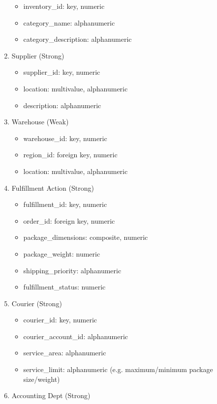 \documentclass{article}
\begin{document}
\begin{enumerate}
    \begin{itemize}
        \item inventory\_id: key, numeric
        \item category\_name: alphanumeric
        \item category\_description: alphanumeric
    \end{itemize}
\item Supplier (Strong)
    \begin{itemize}
        \item supplier\_id: key, numeric
        \item location: multivalue, alphanumeric
        \item description: alphanumeric
    \end{itemize}
\item Warehouse (Weak)
    \begin{itemize}
        \item warehouse\_id: key, numeric
        \item region\_id: foreign key, numeric
        \item location: multivalue, alphanumeric
    \end{itemize}
\item Fulfillment Action (Strong)
    \begin{itemize}
        \item fulfillment\_id: key, numeric
        \item order\_id: foreign key, numeric
        \item package\_dimensions: composite, numeric
        \item package\_weight: numeric
        \item shipping\_priority: alphanumeric
        \item fulfillment\_status: numeric
    \end{itemize}
\item Courier (Strong)
    \begin{itemize}
        \item courier\_id: key, numeric
        \item courier\_account\_id: alphanumeric
        \item service\_area: alphanumeric
        \item service\_limit: alphanumeric (e.g. maximum/minimum package size/weight)
    \end{itemize}
\item Accounting Dept (Strong)
    \begin{itemize}

\end{itemize}
\end{enumerate}
\end{document}
